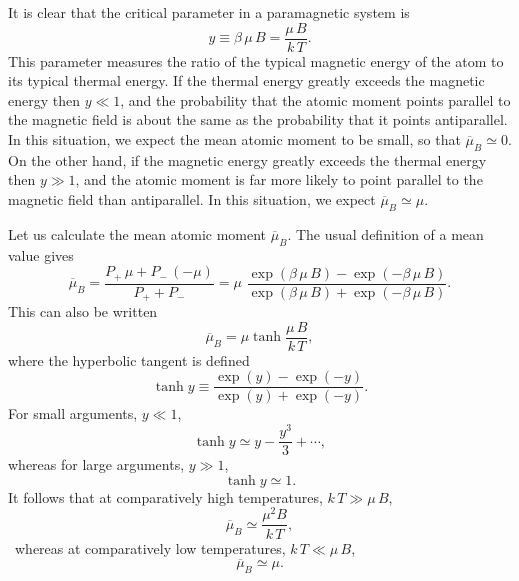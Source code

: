 It is clear that the critical parameter in a paramagnetic system is
\begin{equation}
y\equiv \beta\,\mu \,B = \frac{\mu \,B}{k\,T}.
\end{equation}
This parameter measures the ratio of the typical magnetic energy of the atom to
its typical thermal energy. If the thermal energy greatly exceeds the magnetic
energy then $y\ll 1$, and the probability that the atomic moment points parallel
to the magnetic field is about the same as the probability that it points
antiparallel. In this situation, we expect the mean atomic moment to
be small, so that $\overline{\mu}_B \simeq 0$. On the other hand, if the
magnetic energy greatly exceeds the thermal energy  then $y\gg 1$, and the atomic
moment is far more likely to point parallel to the magnetic field than antiparallel.
In this situation, we expect $\overline{\mu}_B\simeq \mu$. 

Let us calculate the mean atomic moment $\overline{\mu}_B$. The usual
definition of a mean value gives
\begin{equation}
\overline{\mu}_B = \frac{ P_{+}\, \mu + P_{-} \,(-\mu)}{P_{+} + P_{-}}
= \mu \,\,\frac{ \exp(\beta\, \mu\, B)- \exp(-\beta \,\mu \,B)}
{ \exp(\beta \,\mu \,B)+ \exp(-\beta \,\mu \,B)}.
\end{equation}
This can also be written
\begin{equation}
\overline{\mu}_B = \mu \tanh\frac{\mu\, B}{k\,T},
\end{equation}
where the hyperbolic tangent is defined
\begin{equation}
\tanh y \equiv \frac{ \exp(y) - \exp(-y)}{\exp(y)+\exp(-y)}.
\end{equation}
For small arguments, $y \ll 1$,
\begin{equation}
\tanh y \simeq y - \frac{y^3}{3} +\cdots,
\end{equation}
whereas for large arguments, $y \gg 1$,
\begin{equation}
\tanh y \simeq 1.
\end{equation}
It follows that at comparatively high temperatures, $k\, T\gg \mu \,B$, 
\begin{equation}
\overline{\mu}_B \simeq \frac{\mu^2 B}{k\,T},
\end{equation}\
whereas at comparatively low temperatures, $k \,T \ll \mu\, B$,
\begin{equation}
\overline{\mu}_B \simeq \mu.
\end{equation}

